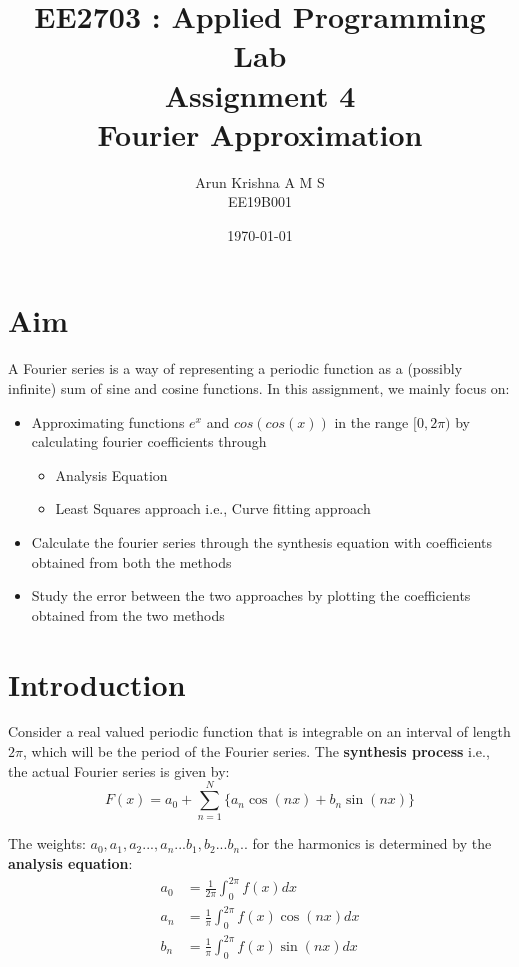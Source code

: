 \documentclass[12pt, a4paper]{report}
\title{\textbf{EE2703 : Applied Programming Lab \\ Assignment 4 \\ Fourier Approximation}} %
\author{Arun Krishna A M S \\ EE19B001} %
\date{\today} %
\begin{document}
		
		
\maketitle %
\justifying

\section*{Aim}
A Fourier series is a way of representing a periodic function as a (possibly infinite) sum of sine and cosine functions. In this assignment, we mainly focus on:
\begin{itemize}
  	\item Approximating functions $e^x$ and $cos(cos(x))$ in the range $[0,2\pi)$ by calculating fourier coefficients through
  	\begin{itemize}
      	\item Analysis Equation
      	\item Least Squares approach i.e., Curve fitting approach
  	\end{itemize}
  	\item Calculate the fourier series through the synthesis equation with coefficients obtained from both the methods
  	\item Study the error between the two approaches by plotting the coefficients obtained from the two methods
\end{itemize}

\section*{Introduction}

Consider a real valued periodic function that is integrable on an interval of length $2\pi$, which will be the period of the Fourier series. The \textbf{synthesis process} i.e., the actual Fourier series is given by:
 \begin{equation*}
F(x)=a_{0} + \sum_{n=1}^{N} \{a_{n}\cos(nx)+b_{n}\sin(nx)\}
 \end{equation*}

The weights: $a_0, a_1, a_2...,a_n...b_1,b_2...b_n..$ for the harmonics is determined by the \textbf{analysis equation}:
 \begin{align*}
a_{0}&=\frac{1}{2\pi}\int_{0}^{2\pi} f(x)dx\\
a_{n}&=\frac{1}{\pi}\int_{0}^{2\pi} f(x)\cos(nx)dx\\
b_{n}&=\frac{1}{\pi}\int_{0}^{2\pi} f(x)\sin(nx)dx\\
 \end{align*}
\end{document}
